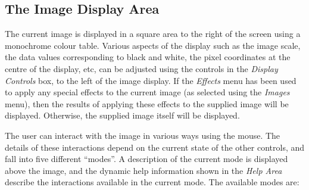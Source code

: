 \documentclass[11pt]{article}
\newcommand{\htmlref}[2]{#1}
\newcommand{\xlabel}[1]{}
\newcommand{\mylabel}[1] {\xlabel{#1}\label{#1}}
\begin{document}
\subsection {\mylabel{POLKA_IMAGE_DISPLAY}The Image Display Area}
The current image is displayed in a square area to the right of the
screen using a monochrome colour table. Various aspects of the display
such as the image scale, the data values corresponding to black and
white, the pixel coordinates at the centre of the display, etc, can be
adjusted using the controls in the \htmlref{\emph{Display
Controls}}{POLKA_DISPLAY_CONTROLS} box, to the left of the image
display. If the \htmlref{\emph{Effects}}{POLKA_EFFECTS_MENU} menu has
been used to apply any special effects to the current image (as selected
using the \htmlref{\emph{Images}}{POLPACK_IMAGES_MENU} menu), then the
results of applying these effects to the supplied image will be
displayed. Otherwise, the supplied image itself will be displayed.

The user can interact with the image in various ways using the mouse. The
details of these interactions depend on the current state of the other
controls, and fall into five different ``modes''. A description of the
current mode is displayed above the image, and the dynamic help
information shown in the \htmlref{\emph{Help Area}}{POLKA_HELP_AREA}
describe the interactions available in the current mode. The available
modes are:
\end{document}
